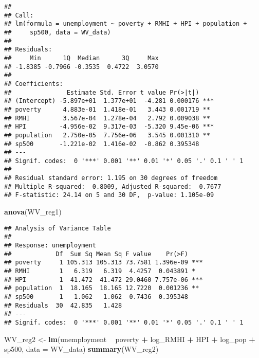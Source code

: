 \documentclass[
]{article}
\newenvironment{Shaded}{\begin{snugshade}}{\end{snugshade}}
\newcommand{\DataTypeTok}[1]{\textcolor[rgb]{0.13,0.29,0.53}{#1}}
\newcommand{\KeywordTok}[1]{\textcolor[rgb]{0.13,0.29,0.53}{\textbf{#1}}}
\newcommand{\NormalTok}[1]{#1}
\newcommand{\OperatorTok}[1]{\textcolor[rgb]{0.81,0.36,0.00}{\textbf{#1}}}
\newcommand{\StringTok}[1]{\textcolor[rgb]{0.31,0.60,0.02}{#1}}
\begin{document}
\begin{verbatim}
## 
## Call:
## lm(formula = unemployment ~ poverty + RMHI + HPI + population + 
##     sp500, data = WV_data)
## 
## Residuals:
##     Min      1Q  Median      3Q     Max 
## -1.8385 -0.7966 -0.3535  0.4722  3.0570 
## 
## Coefficients:
##               Estimate Std. Error t value Pr(>|t|)    
## (Intercept) -5.897e+01  1.377e+01  -4.281 0.000176 ***
## poverty      4.883e-01  1.418e-01   3.443 0.001719 ** 
## RMHI         3.567e-04  1.278e-04   2.792 0.009038 ** 
## HPI         -4.956e-02  9.317e-03  -5.320 9.45e-06 ***
## population   2.750e-05  7.756e-06   3.545 0.001310 ** 
## sp500       -1.221e-02  1.416e-02  -0.862 0.395348    
## ---
## Signif. codes:  0 '***' 0.001 '**' 0.01 '*' 0.05 '.' 0.1 ' ' 1
## 
## Residual standard error: 1.195 on 30 degrees of freedom
## Multiple R-squared:  0.8009, Adjusted R-squared:  0.7677 
## F-statistic: 24.14 on 5 and 30 DF,  p-value: 1.105e-09
\end{verbatim}

\begin{Shaded}
\begin{Highlighting}[]
\KeywordTok{anova}\NormalTok{(WV_reg1)}
\end{Highlighting}
\end{Shaded}

\begin{verbatim}
## Analysis of Variance Table
## 
## Response: unemployment
##            Df  Sum Sq Mean Sq F value    Pr(>F)    
## poverty     1 105.313 105.313 73.7581 1.396e-09 ***
## RMHI        1   6.319   6.319  4.4257  0.043891 *  
## HPI         1  41.472  41.472 29.0460 7.757e-06 ***
## population  1  18.165  18.165 12.7220  0.001236 ** 
## sp500       1   1.062   1.062  0.7436  0.395348    
## Residuals  30  42.835   1.428                      
## ---
## Signif. codes:  0 '***' 0.001 '**' 0.01 '*' 0.05 '.' 0.1 ' ' 1
\end{verbatim}

\begin{Shaded}
\begin{Highlighting}[]
\NormalTok{WV_reg2 <-}\StringTok{ }\KeywordTok{lm}\NormalTok{(unemployment }\OperatorTok{~}\StringTok{ }\NormalTok{poverty }\OperatorTok{+}\StringTok{ }\NormalTok{log_RMHI }\OperatorTok{+}\StringTok{ }\NormalTok{HPI }\OperatorTok{+}\StringTok{ }\NormalTok{log_pop }\OperatorTok{+}\StringTok{ }\NormalTok{sp500, }\DataTypeTok{data =}\NormalTok{ WV_data)}
\KeywordTok{summary}\NormalTok{(WV_reg2)}
\end{Highlighting}
\end{Shaded}
\end{document}
